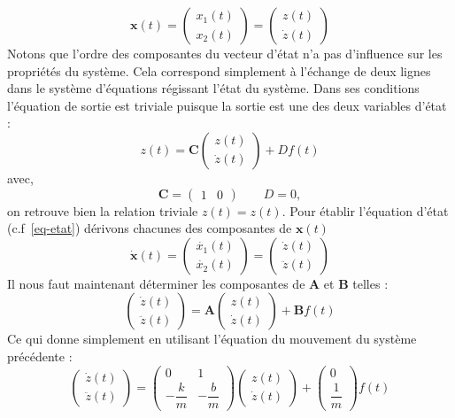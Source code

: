 \[
    \boldsymbol{x}(t)=
    \begin{pmatrix} x_1(t) \\ x_2(t) \end{pmatrix}=
    \begin{pmatrix} z(t) \\ \dot{z}(t) \end{pmatrix}
\]
Notons que l'ordre des composantes du vecteur d'état n'a pas d'influence sur
les propriétés du système. Cela correspond simplement à l'échange de deux lignes
dans le système d'équations régissant l'état du système.
Dans ses conditions l'équation de sortie est triviale puisque la sortie est
une des deux variables d'état :
\[
    z(t)=\boldsymbol{C}\begin{pmatrix} z(t)\\\dot{z}(t)\end{pmatrix} + Df(t)
\]
avec,
\[
    \boldsymbol{C}=\begin{pmatrix} 1 & 0 \end{pmatrix}\quad\quad D=0,
\]
on retrouve bien la relation triviale $z(t)=z(t)$.
\newpage
\restoregeometry
\captionsetup{width=0.9\linewidth}
Pour établir l'équation d'état (c.f~\cref{eq-etat}) dérivons chacunes des 
composantes de $\boldsymbol{x}(t)$
\[
    \boldsymbol{\dot{x}}(t)=
    \begin{pmatrix} \dot{x_1}(t) \\ \dot{x_2}(t) \end{pmatrix}=
    \begin{pmatrix} \dot{z}(t) \\ \ddot{z}(t) \end{pmatrix}
\]
Il nous faut maintenant déterminer les composantes de $\boldsymbol{A}$ et 
$\boldsymbol{B}$ telles :
\[
    \begin{pmatrix} \dot{z}(t) \\ \ddot{z}(t) \end{pmatrix}=
    \boldsymbol{A}\begin{pmatrix} z(t) \\ \dot{z}(t) \end{pmatrix} +
    \boldsymbol{B}f(t)
\]
Ce qui donne simplement en utilisant l'équation du mouvement du système 
précédente :
\[
    \begin{pmatrix} \dot{z}(t) \\ \ddot{z}(t) \end{pmatrix}=
    \begin{pmatrix} 
        0 & 1 \\[1em]
        -\dfrac{k}{m} & -\dfrac{b}{m}
    \end{pmatrix} 
    \begin{pmatrix} z(t) \\ \dot{z}(t) \end{pmatrix} +
    \begin{pmatrix} 0 \\[1em] \dfrac{1}{m} \end{pmatrix}f(t)
\]
